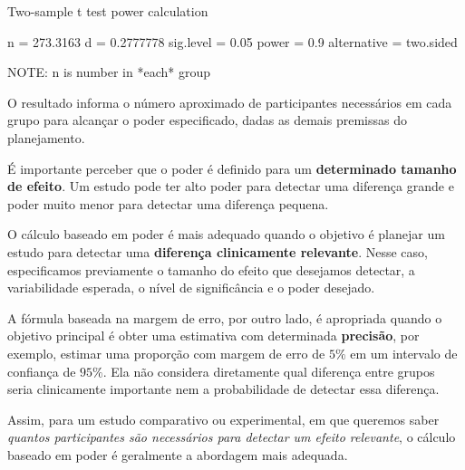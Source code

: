 \begin{code}
        Two-sample t test power calculation 

            n = 273.3163
            d = 0.2777778
    sig.level = 0.05
        power = 0.9
alternative = two.sided

NOTE: n is number in *each* group
\end{code}

O resultado informa o número aproximado de participantes necessários em cada
grupo para alcançar o poder especificado, dadas as demais premissas do
planejamento.

É importante perceber que o poder é definido para um \textbf{determinado
tamanho de efeito}. Um estudo pode ter alto poder para detectar uma diferença
grande e poder muito menor para detectar uma diferença pequena.

\begin{deepdive}

O cálculo baseado em poder é mais adequado quando o objetivo é planejar um
estudo para detectar uma \textbf{diferença clinicamente relevante}. Nesse caso, especificamos previamente o tamanho do efeito que desejamos detectar, a
variabilidade esperada, o nível de significância e o poder desejado.

A fórmula baseada na margem de erro, por outro lado, é apropriada quando o
objetivo principal é obter uma estimativa com determinada \textbf{precisão},
por exemplo, estimar uma proporção com margem de erro de $5\%$ em um intervalo
de confiança de $95\%$. Ela não considera diretamente qual diferença entre
grupos seria clinicamente importante nem a probabilidade de detectar essa
diferença.

Assim, para um estudo comparativo ou experimental, em que queremos saber
\emph{quantos participantes são necessários para detectar um efeito relevante}, o cálculo baseado em poder é geralmente a abordagem mais adequada.
\end{deepdive}


